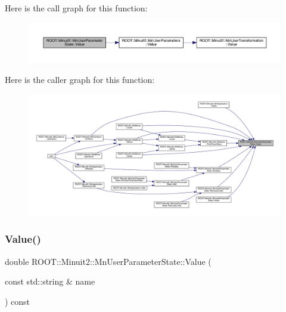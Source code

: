 Here is the call graph for this function\+:
\nopagebreak
\begin{figure}[H]
\begin{center}
\leavevmode
\includegraphics[width=350pt]{d3/de0/classROOT_1_1Minuit2_1_1MnUserParameterState_a0f977953363899fd9ee8933b879cde3e_cgraph}
\end{center}
\end{figure}
Here is the caller graph for this function\+:
\nopagebreak
\begin{figure}[H]
\begin{center}
\leavevmode
\includegraphics[width=350pt]{d3/de0/classROOT_1_1Minuit2_1_1MnUserParameterState_a0f977953363899fd9ee8933b879cde3e_icgraph}
\end{center}
\end{figure}
\mbox{\label{classROOT_1_1Minuit2_1_1MnUserParameterState_a02135107320f1ce5680fe25cf406f08f}} 
\subsubsection{\texorpdfstring{Value()}{Value()}\hspace{0.1cm}{\footnotesize\ttfamily [4/6]}}
{\footnotesize\ttfamily double R\+O\+O\+T\+::\+Minuit2\+::\+Mn\+User\+Parameter\+State\+::\+Value (\begin{DoxyParamCaption}\item[{const std\+::string \&}]{name }\end{DoxyParamCaption}) const}

